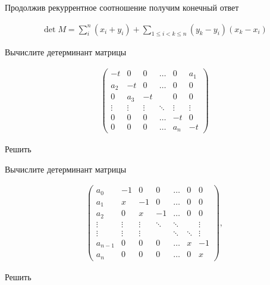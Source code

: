 \begin{sol}
    Продолжив рекуррентное соотношение получим конечный ответ
    
    \begin{gather*}
        \det M = \sum_{i}^{n}(x_{i} + y_{i}) + \sum_{1 \leq i < k \leq n}(y_{k} - y_{i})(x_{k} - x_{i})
    \end{gather*}
\end{sol}

\begin{prb}
    Вычислите детерминант матрицы
    
    \begin{gather*}
        \left(\begin{array}{cccccc}
        -t & 0 & 0 & \ldots & 0 & a_{1} \\
        a_{2} & -t & 0 & \ldots & 0 & 0 \\
        0 & a_{3} & -t & & 0 & 0 \\
        \vdots & \vdots & \vdots & \ddots & \vdots & \vdots \\
        0 & 0 & 0 & \ldots & -t & 0 \\
        0 & 0 & 0 & \ldots & a_{n} & -t
        \end{array}\right)
    \end{gather*}
\end{prb}

\begin{sol}
    Решить
\end{sol}


\begin{prb}
    Вычислите детерминант матрицы
    
    \begin{gather*}
    \left(\begin{array}{ccccccc}
    a_{0} & -1 & 0 & 0 & \ldots & 0 & 0 \\
    a_{1} & x & -1 & 0 & \ldots & 0 & 0 \\
    a_{2} & 0 & x & -1 & \ldots & 0 & 0 \\
    \vdots & \vdots & \vdots & \ddots & \ddots & & \vdots \\
    \vdots & \vdots & \vdots & & \ddots & \ddots & \vdots \\
    a_{n-1} & 0 & 0 & 0 & \ldots & x & -1 \\
    a_{n} & 0 & 0 & 0 & \ldots & 0 & x
    \end{array}\right),
    \end{gather*}
\end{prb}

\begin{sol}
    Решить
\end{sol}


